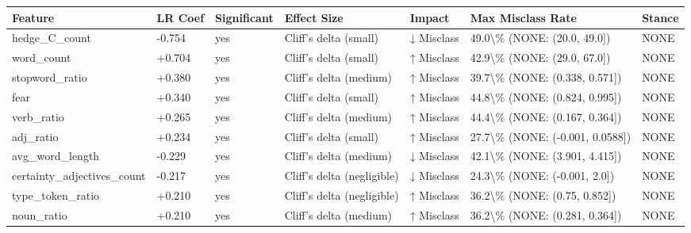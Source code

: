 \begin{tabular}{lllllll}
\toprule
Feature & LR Coef & Significant & Effect Size & Impact & Max Misclass Rate & Stance \\
\midrule
hedge\_C\_count & -0.754 & yes & Cliff's delta (small) & ↓ Misclass & 49.0\textbackslash \% (NONE: (20.0, 49.0]) & NONE \\
word\_count & +0.704 & yes & Cliff's delta (small) & ↑ Misclass & 42.9\textbackslash \% (NONE: (29.0, 67.0]) & NONE \\
stopword\_ratio & +0.380 & yes & Cliff's delta (medium) & ↑ Misclass & 39.7\textbackslash \% (NONE: (0.338, 0.571]) & NONE \\
fear & +0.340 & yes & Cliff's delta (small) & ↑ Misclass & 44.8\textbackslash \% (NONE: (0.824, 0.995]) & NONE \\
verb\_ratio & +0.265 & yes & Cliff's delta (medium) & ↑ Misclass & 44.4\textbackslash \% (NONE: (0.167, 0.364]) & NONE \\
adj\_ratio & +0.234 & yes & Cliff's delta (small) & ↑ Misclass & 27.7\textbackslash \% (NONE: (-0.001, 0.0588]) & NONE \\
avg\_word\_length & -0.229 & yes & Cliff's delta (medium) & ↓ Misclass & 42.1\textbackslash \% (NONE: (3.901, 4.415]) & NONE \\
certainty\_adjectives\_count & -0.217 & yes & Cliff's delta (negligible) & ↓ Misclass & 24.3\textbackslash \% (NONE: (-0.001, 2.0]) & NONE \\
type\_token\_ratio & +0.210 & yes & Cliff's delta (negligible) & ↑ Misclass & 36.2\textbackslash \% (NONE: (0.75, 0.852]) & NONE \\
noun\_ratio & +0.210 & yes & Cliff's delta (medium) & ↑ Misclass & 36.2\textbackslash \% (NONE: (0.281, 0.364]) & NONE \\
\bottomrule
\end{tabular}
